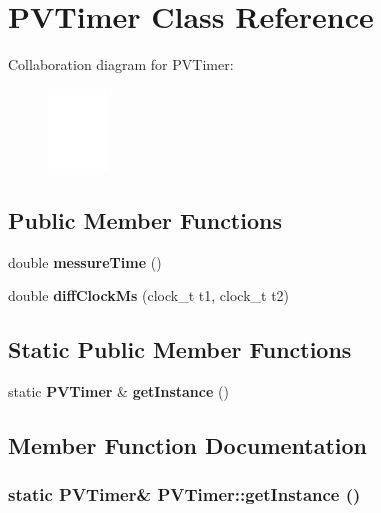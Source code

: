 \section{PVTimer Class Reference}
\label{class_p_v_timer}
Collaboration diagram for PVTimer:\nopagebreak
\begin{figure}[H]
\begin{center}
\leavevmode
\includegraphics[width=44pt]{class_p_v_timer__coll__graph}
\end{center}
\end{figure}
\subsection*{Public Member Functions}
\begin{CompactItemize}
\item 
double {\bf messureTime} ()
\item 
double {\bf diffClockMs} (clock\_\-t t1, clock\_\-t t2)
\end{CompactItemize}
\subsection*{Static Public Member Functions}
\begin{CompactItemize}
\item 
static {\bf PVTimer} \& {\bf getInstance} ()
\end{CompactItemize}


\subsection{Member Function Documentation}
\subsubsection[{getInstance}]{\setlength{\rightskip}{0pt plus 5cm}static {\bf PVTimer}\& PVTimer::getInstance ()\hspace{0.3cm}{\tt  [static]}}\label{class_p_v_timer_c0f313309b0ea2324458fc2f277aa83b}


